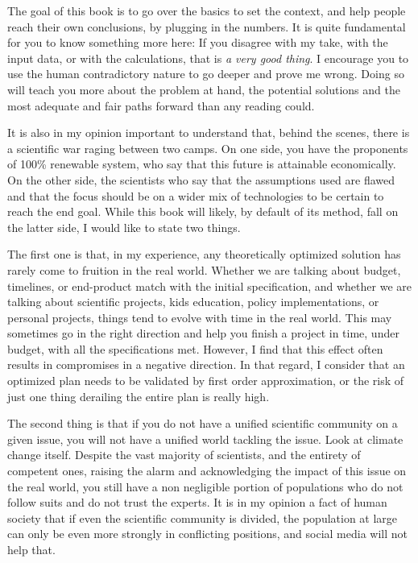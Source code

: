 The goal of this book is to go over the basics to set the context, and help people reach their own conclusions, by plugging in the numbers. It is quite fundamental for you to know something more here: If you disagree with my take, with the input data, or with the calculations, that is \emph{a very good thing}. I encourage you to use the human contradictory nature to go deeper and prove me wrong. Doing so will teach you more about the problem at hand, the potential solutions and the most adequate and fair paths forward than any reading could.

It is also in my opinion important to understand that, behind the scenes, there is a scientific war raging between two camps. On one side, you have the proponents of 100\% renewable system, who say that this future is attainable economically. On the other side, the scientists who say that the assumptions used are flawed and that the focus should be on a wider mix of technologies to be certain to reach the end goal. While this book will likely, by default of its method, fall on the latter side, I would like to state two things.

The first one is that, in my experience, any theoretically optimized solution has rarely come to fruition in the real world. Whether we are talking about budget, timelines, or end-product match with the initial specification, and whether we are talking about scientific projects, kids education, policy implementations, or personal projects, things tend to evolve with time in the real world. This may sometimes go in the right direction and help you finish a project in time, under budget, with all the specifications met. However, I find that this effect often results in compromises in a negative direction. In that regard, I consider that an optimized plan needs to be validated by first order approximation, or the risk of just one thing derailing the entire plan is really high.

The second thing is that if you do not have a unified scientific community on a given issue, you will not have a unified world tackling the issue. Look at climate change itself. Despite the vast majority of scientists, and the entirety of competent ones, raising the alarm and acknowledging the impact of this issue on the real world, you still have a non negligible portion of populations who do not follow suits and do not trust the experts. It is in my opinion a fact of human society that if even the scientific community is divided, the population at large can only be even more strongly in conflicting positions, and social media will not help that.

